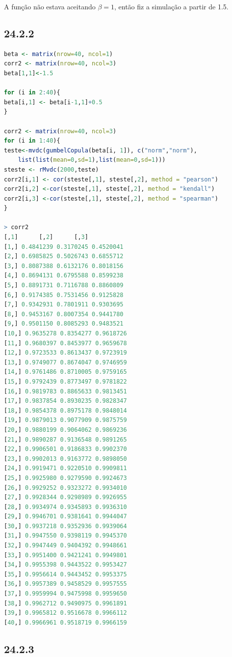 \documentclass[12pt]{article}
\begin{document}
A função não estava aceitando $\beta = 1$, então fiz a simulação a partir de 1.5.

\subsection*{24.2.2}

\begin{lstlisting}[language=R]
beta <- matrix(nrow=40, ncol=1)
corr2 <- matrix(nrow=40, ncol=3)
beta[1,1]<-1.5

for (i in 2:40){
beta[i,1] <- beta[i-1,1]+0.5
}

corr2 <- matrix(nrow=40, ncol=3)
for (i in 1:40){
teste<-mvdc(gumbelCopula(beta[i, 1]), c("norm","norm"),
	list(list(mean=0,sd=1),list(mean=0,sd=1)))
steste <- rMvdc(2000,teste)
corr2[i,1] <- cor(steste[,1], steste[,2], method = "pearson")
corr2[i,2] <-cor(steste[,1], steste[,2], method = "kendall")
corr2[i,3] <-cor(steste[,1], steste[,2], method = "spearman")
}

> corr2
[,1]      [,2]      [,3]
[1,] 0.4841239 0.3170245 0.4520041
[2,] 0.6985825 0.5026743 0.6855712
[3,] 0.8087388 0.6132176 0.8018156
[4,] 0.8694131 0.6795588 0.8599238
[5,] 0.8891731 0.7116788 0.8860809
[6,] 0.9174385 0.7531456 0.9125828
[7,] 0.9342931 0.7801911 0.9303695
[8,] 0.9453167 0.8007354 0.9441780
[9,] 0.9501150 0.8085293 0.9483521
[10,] 0.9635278 0.8354277 0.9618726
[11,] 0.9680397 0.8453977 0.9659678
[12,] 0.9723533 0.8613437 0.9723919
[13,] 0.9749077 0.8674047 0.9746959
[14,] 0.9761486 0.8710005 0.9759165
[15,] 0.9792439 0.8773497 0.9781822
[16,] 0.9819783 0.8865633 0.9813451
[17,] 0.9837854 0.8930235 0.9828347
[18,] 0.9854378 0.8975178 0.9848014
[19,] 0.9879013 0.9077909 0.9875759
[20,] 0.9880199 0.9064062 0.9869236
[21,] 0.9890287 0.9136548 0.9891265
[22,] 0.9906501 0.9186833 0.9902370
[23,] 0.9902013 0.9163772 0.9898050
[24,] 0.9919471 0.9220510 0.9909811
[25,] 0.9925980 0.9279590 0.9924673
[26,] 0.9929252 0.9323272 0.9934010
[27,] 0.9928344 0.9298989 0.9926955
[28,] 0.9934974 0.9345893 0.9936310
[29,] 0.9946701 0.9381641 0.9944047
[30,] 0.9937218 0.9352936 0.9939064
[31,] 0.9947550 0.9398119 0.9945370
[32,] 0.9947449 0.9404392 0.9948661
[33,] 0.9951400 0.9421241 0.9949801
[34,] 0.9955398 0.9443522 0.9953427
[35,] 0.9956614 0.9443452 0.9953375
[36,] 0.9957389 0.9458529 0.9957555
[37,] 0.9959994 0.9475998 0.9959650
[38,] 0.9962712 0.9490975 0.9961891
[39,] 0.9965812 0.9516678 0.9966112
[40,] 0.9966961 0.9518719 0.9966159
\end{lstlisting}

\subsection*{24.2.3}
\end{document}
